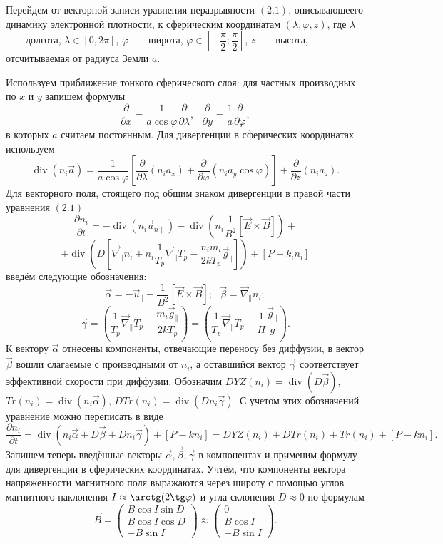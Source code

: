 \documentclass[14pt, a4paper, fleqn]{extarticle}
\renewcommand{\div}{\operatorname{div}}
\begin{document}
Перейдем от векторной записи уравнения неразрывности $(2.1)$, описывающеего динамику электронной плотности, к сферическим координатам $(\lambda, \varphi, z)$, где $\lambda$~---~долгота, $\lambda \in [0, 2\pi]$, $\varphi$~---~широта, $\varphi \in \left[-\dfrac{\pi}{2};\dfrac{\pi}{2}\right]$, $z$~---~высота, отсчитываемая от радиуса Земли $a$. 

Используем приближение тонкого сферического слоя: для частных производных по $x$ и $y$ запишем формулы $$\dfrac{\partial}{\partial x}=\dfrac{1}{a\cos\varphi}\dfrac{\partial}{\partial\lambda},\mbox{ } \dfrac{\partial}{\partial y} = \dfrac{1}{a}\dfrac{\partial}{\partial\varphi},$$ в которых $a$ считаем постоянным. Для дивергенции в сферических координатах используем $$\div(n_i \vec{a}) = \dfrac{1}{a\cos\varphi}\left[\dfrac{\partial}{\partial\lambda}(n_i a_x)+\dfrac{\partial}{\partial\varphi}(n_i a_y\cos\varphi)\right]+\dfrac{\partial}{\partial z}(n_i a_z).$$
Для векторного поля, стоящего под общим знаком дивергенции в правой части уравнения $(2.1)$ $$\dfrac{\partial n_i}{\partial t} = -\div(n_i \vec{u}_{n\parallel})-\div\left(n_i\dfrac{1}{B^2}[\vec{E}\times \vec{B}] \right)+$$ $$+\div\left(D\left[\vec{\nabla}_\parallel n_i +n_i\dfrac{1}{T_p}\vec{\nabla}_\parallel T_p - \dfrac{n_i m_i}{2kT_p}\vec{g}_\parallel\right]\right)+[P-k_in_i]$$ введём следующие обозначения: $$\vec{\alpha}=-\vec{u}_\parallel-\dfrac{1}{B^2}[\vec{E}\times\vec{B}]; \mbox{ }\vec{\beta} = \vec{\nabla}_\parallel n_i;$$ $$\vec{\gamma} = \left(\dfrac{1}{T_p}\vec{\nabla}_\parallel  T_p - \dfrac{m_i \vec{g}_\parallel}{2kT_p}\right)=\left(\dfrac{1}{T_p}\vec{\nabla}_\parallel  T_p - \dfrac{1}{H}\dfrac{\vec{g}_\parallel}{g}\right).$$
К вектору $\vec{\alpha}$ отнесены компоненты, отвечающие переносу без диффузии, в вектор $\vec{\beta}$ вошли слагаемые с производными от $n_i$, а оставшийся вектор $\vec{\gamma}$ соответствует эффективной скорости при диффузии. Обозначим $DYZ(n_i) = \div(D\vec{\beta})$, $Tr(n_i) = \div(n_i\vec{\alpha})$, $DTr(n_i) = \div(Dn_i\vec{\gamma})$. С учетом этих обозначений уравнение можно переписать в виде $$\dfrac{\partial n_i}{\partial t} = \div(n_i\vec{\alpha} + D\vec{\beta}+Dn_i\vec{\gamma})+[P-kn_i]=DYZ(n_i)+DTr(n_i)+Tr(n_i)+[P-kn_i].$$
Запишем теперь введённые векторы $\vec{\alpha}, \vec{\beta}, \vec{\gamma}$ в компонентах и применим формулу для дивергенции в сферических координатах. Учтём, что компоненты вектора напряженности магнитного поля выражаются через широту с помощью углов магнитного наклонения $I\approx \arctg(2\tg\varphi)$ и угла склонения $D\approx 0$ по формулам
$$\vec{B} = \left(\begin{array}{crl}
B\cos I \sin D\\
B\cos I \cos D\\
-B\sin I
\end{array}\right)\approx
\left(\begin{array}{crl}
0\\
B\cos I\\
-B\sin I
\end{array}\right).
$$
\end{document}
